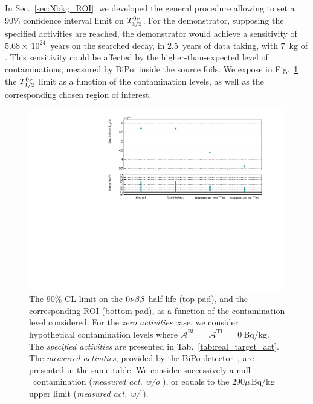 In Sec.~\ref{sec:Nbkg_ROI}, we developed the general procedure allowing to set a $90\%$ confidence interval limit on $T_{1/2}^{0\nu}$.
For the demonstrator, supposing the specified activities are reached, the demonstrator would achieve a sensitivity of $5.68\times~10^{24}$~years on the searched decay, in $2.5$~years of data taking, with $7$~kg of \Se.
This sensitivity could be affected by the higher-than-expected level of contaminations, measured by BiPo, inside the source foils.
We expose in Fig.~\ref{fig:real_target_act} the $T_{1/2}^{0\nu}$ limit as a function of the contamination levels, as well as the corresponding chosen region of interest.
\begin{figure}[h]
  \centering
  \includegraphics[width=1.1\textwidth]{Sensitivity/fig_sensitivity/contamination_level_Se_B.pdf}
  \caption{The $90\%$ CL limit on the $0\nu\beta\beta$ half-life (top pad), and the corresponding ROI (bottom pad), as a function of the contamination level considered.
    For the \emph{zero activities} case, we consider hypothetical contamination levels where $\mathcal{A}^{\text{Bi}}~=~\mathcal{A}^{\text{Tl}}~=~0~$Bq/kg.
    The \emph{specified activities} are presented in Tab.~\ref{tab:real_target_act}.
    The \emph{measured activities}, provided by the BiPo detector~\cite{internal:bipo}, are presented in the same table.
    We consider successively a null \Bi\ contamination (\emph{measured act. w/o \Bi}), or equals to the $290\mu\,$Bq/kg upper limit (\emph{measured act. w/ \Bi}).
    \label{fig:real_target_act}}
\end{figure}
